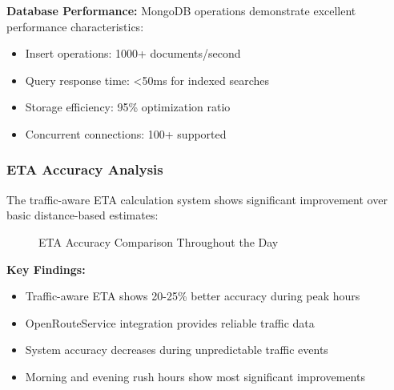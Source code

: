 \documentclass[12pt,a4paper]{article}
\begin{document}
\textbf{Database Performance:}
MongoDB operations demonstrate excellent performance characteristics:
\begin{itemize}
    \item Insert operations: 1000+ documents/second
    \item Query response time: <50ms for indexed searches
    \item Storage efficiency: 95\% optimization ratio
    \item Concurrent connections: 100+ supported
\end{itemize}

\subsubsection{ETA Accuracy Analysis}

The traffic-aware ETA calculation system shows significant improvement over basic distance-based estimates:

\begin{figure}[H]
\centering
{}
\caption{ETA Accuracy Comparison Throughout the Day}
\label{fig:eta_accuracy}
\end{figure}

\textbf{Key Findings:}
\begin{itemize}
    \item Traffic-aware ETA shows 20-25\% better accuracy during peak hours
    \item OpenRouteService integration provides reliable traffic data
    \item System accuracy decreases during unpredictable traffic events
    \item Morning and evening rush hours show most significant improvements
\end{itemize}
\end{document}
